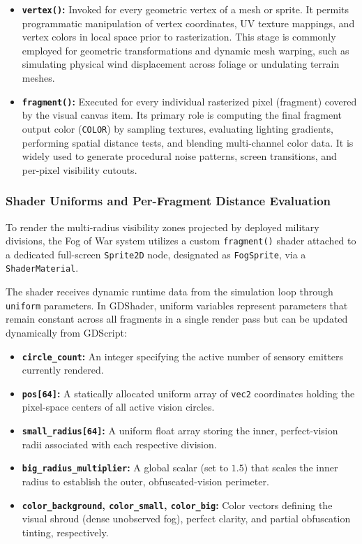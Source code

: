 \begin{itemize}
    \item \textbf{\texttt{vertex()}:} Invoked for every geometric vertex of a mesh or sprite. It permits programmatic manipulation of vertex coordinates, UV texture mappings, and vertex colors in local space prior to rasterization. This stage is commonly employed for geometric transformations and dynamic mesh warping, such as simulating physical wind displacement across foliage or undulating terrain meshes.
    \item \textbf{\texttt{fragment()}:} Executed for every individual rasterized pixel (fragment) covered by the visual canvas item. Its primary role is computing the final fragment output color (\texttt{COLOR}) by sampling textures, evaluating lighting gradients, performing spatial distance tests, and blending multi-channel color data. It is widely used to generate procedural noise patterns, screen transitions, and per-pixel visibility cutouts.
\end{itemize}

\subsubsection{Shader Uniforms and Per-Fragment Distance Evaluation}
To render the multi-radius visibility zones projected by deployed military divisions, the Fog of War system utilizes a custom \texttt{fragment()} shader attached to a dedicated full-screen \texttt{Sprite2D} node, designated as \texttt{FogSprite}, via a \texttt{ShaderMaterial}.

The shader receives dynamic runtime data from the simulation loop through \texttt{uniform} parameters. In GDShader, uniform variables represent parameters that remain constant across all fragments in a single render pass but can be updated dynamically from GDScript:
\begin{itemize}
    \item \textbf{\texttt{circle\_count}:} An integer specifying the active number of sensory emitters currently rendered.
    \item \textbf{\texttt{pos[64]}:} A statically allocated uniform array of \texttt{vec2} coordinates holding the pixel-space centers of all active vision circles.
    \item \textbf{\texttt{small\_radius[64]}:} A uniform float array storing the inner, perfect-vision radii associated with each respective division.
    \item \textbf{\texttt{big\_radius\_multiplier}:} A global scalar (set to $1.5$) that scales the inner radius to establish the outer, obfuscated-vision perimeter.
    \item \textbf{\texttt{color\_background}, \texttt{color\_small}, \texttt{color\_big}:} Color vectors defining the visual shroud (dense unobserved fog), perfect clarity, and partial obfuscation tinting, respectively.
\end{itemize}

